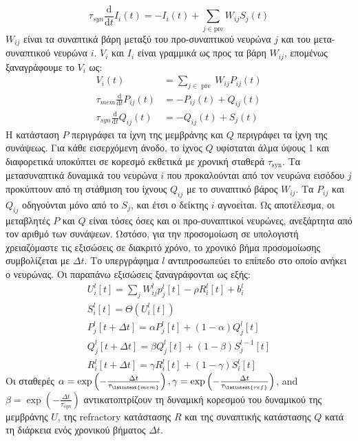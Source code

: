 \documentclass[12pt]{report}
\begin{document}
\begin{equation}
\tau_{s y n} \frac{\mathrm{d}}{\mathrm{d} t} I_{i}(t)=-I_{i}(t)+\sum_{j \in \mathrm{pre}} W_{i j} S_{j}(t)
\end{equation}
$W_{i j}$ είναι τα συναπτικά βάρη μεταξύ του προ-συναπτικού νευρώνα $j$ και του μετα-συναπτικού νευρώνα $i$. $V_{i}$ και $I_{i}$ είναι γραμμικά ως προς τα βάρη $W_{i j}$, επομένως ξαναγράφουμε το $ V_ {i} $ ως:
\begin{equation}
\begin{aligned}
V_{i}(t) &=\sum_{j \in \text { pre }} W_{i j} P_{i j}(t) \\
\tau_{m e m} \frac{\mathrm{d}}{\mathrm{d} t} P_{i j}(t) &=-P_{i j}(t)+Q_{i j}(t) \\
\tau_{s y n} \frac{\mathrm{d}}{\mathrm{d} t} Q_{i j}(t) &=-Q_{i j}(t)+S_{j}(t)
\end{aligned}
\end{equation}
Η κατάσταση $P$  περιγράφει τα ίχνη της μεμβράνης και $Q$  περιγράφει τα ίχνη της συνάψεως. Για κάθε εισερχόμενη άνοδο, το ίχνος $Q$ υφίσταται άλμα ύψους 1 και διαφορετικά υποκύπτει σε κορεσμό εκθετικά με χρονική σταθερά $\tau_{\mathrm{syn}}$. Τα μετασυναπτικά δυναμικά του νευρώνα $i$ που προκαλούνται από τον νευρώνα εισόδου $j$ προκύπτουν από τη στάθμιση του ίχνους $Q_{i j}$ με το συναπτικό βάρος $W_{i j}$. Τα $P_{i j}$ και $Q_{i j}$ οδηγούνται μόνο από το $S_{j}$, και έτσι ο δείκτης $i$ αγνοείται. Ως αποτέλεσμα, οι μεταβλητές $P$ και $Q$ είναι τόσες όσες και οι προ-συναπτικοί νευρώνες, ανεξάρτητα από τον αριθμό των συνάψεων.
Ωστόσο, για την προσομοίωση σε υπολογιστή χρειαζόμαστε τις εξισώσεις σε διακριτό χρόνο, το χρονικό βήμα προσομοίωσης συμβολίζεται με $\Delta t$. Το υπεργράφημα $l$ αντιπροσωπεύει το επίπεδο στο οποίο ανήκει ο νευρώνας. Οι παραπάνω εξισώσεις ξαναγράφονται ως εξής:
\begin{equation}
\begin{aligned}
U_{i}^{l}[t]=\sum_{j} W_{i j}^{l} p_{j}^{l}[t]-\rho R_{i}^{l}[t]+b_{i}^{l} \\
S_{i}^{l}[t]=\Theta\left(U_{i}^{l}[t]\right) \\
P_{j}^{l}[t+\Delta t]=\alpha P_{j}^{l}[t]+(1-\alpha) Q_{j}^{l}[t] \\
Q_{j}^{l}[t+\Delta t]=\beta Q_{j}^{l}[t]+(1-\beta) S_{j}^{l-1}[t] \\
R_{i}^{l}[t+\Delta t]=\gamma R_{i}^{l}[t]+(1-\gamma) S_{i}^{l}[t]
\end{aligned}
\end{equation}
Οι σταθερές $\alpha=\exp \left(-\frac{\Delta t}{\tau_{\latintext {mem }}}\right), \gamma=\exp \left(-\frac{\Delta t}{\tau_{\latintext {ref }}}\right)$, and $\beta=\exp \left(-\frac{\Delta t}{\tau_{s y n}}\right)$ αντικατοπτρίζουν τη δυναμική κορεσμού του δυναμικού της μεμβράνης $U$, της \textlatin{refractory} κατάστασης $R$ και της συναπτικής κατάστασης $Q$ κατά τη διάρκεια ενός χρονικού βήματος $\Delta t$.
\end{document}
